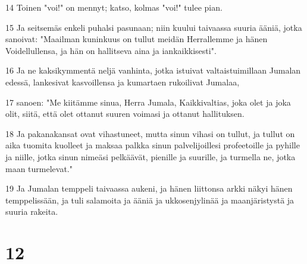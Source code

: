 \par 14 Toinen "voi!" on mennyt; katso, kolmas "voi!" tulee pian.
\par 15 Ja seitsemäs enkeli puhalsi pasunaan; niin kuului taivaassa suuria ääniä, jotka sanoivat: "Maailman kuninkuus on tullut meidän Herrallemme ja hänen Voidellullensa, ja hän on hallitseva aina ja iankaikkisesti".
\par 16 Ja ne kaksikymmentä neljä vanhinta, jotka istuivat valtaistuimillaan Jumalan edessä, lankesivat kasvoillensa ja kumartaen rukoilivat Jumalaa,
\par 17 sanoen: "Me kiitämme sinua, Herra Jumala, Kaikkivaltias, joka olet ja joka olit, siitä, että olet ottanut suuren voimasi ja ottanut hallituksen.
\par 18 Ja pakanakansat ovat vihastuneet, mutta sinun vihasi on tullut, ja tullut on aika tuomita kuolleet ja maksaa palkka sinun palvelijoillesi profeetoille ja pyhille ja niille, jotka sinun nimeäsi pelkäävät, pienille ja suurille, ja turmella ne, jotka maan turmelevat."
\par 19 Ja Jumalan temppeli taivaassa aukeni, ja hänen liittonsa arkki näkyi hänen temppelissään, ja tuli salamoita ja ääniä ja ukkosenjylinää ja maanjäristystä ja suuria rakeita.

\chapter{12}

